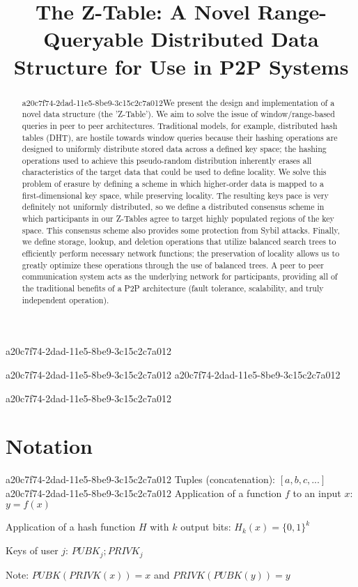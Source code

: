 \documentclass[12pt]{article}
\title{The Z-Table: A Novel Range-Queryable Distributed Data Structure for Use in P2P Systems}
\begin{document}
a20c7f74-2dad-11e5-8be9-3c15c2c7a012
\maketitle
a20c7f74-2dad-11e5-8be9-3c15c2c7a012
a20c7f74-2dad-11e5-8be9-3c15c2c7a012\begin{abstract}
a20c7f74-2dad-11e5-8be9-3c15c2c7a012We present the design and implementation of a novel data structure (the 'Z-Table'). We aim to solve the issue of window/range-based queries in peer to peer architectures. Traditional models, for example,  distributed hash tables (DHT), are hostile towards window queries because their hashing operations are designed to uniformly distribute stored data across a defined key space; the hashing operations used to achieve this pseudo-random distribution inherently erases all characteristics of the target data that could be used to define locality. We solve this problem of erasure by defining a scheme in which higher-order data is mapped to a first-dimensional key space, while preserving locality. The resulting keys pace is very definitely not uniformly distributed, so we define a distributed consensus scheme in which participants in our Z-Tables agree to target highly populated regions of the key space. This consensus scheme also provides some protection from Sybil attacks. Finally, we define storage, lookup, and deletion operations that utilize balanced search trees to efficiently perform necessary network functions; the preservation of locality allows us to greatly optimize these operations through the use of balanced trees. A peer to peer communication system acts as the underlying network for participants, providing all of the traditional benefits of a P2P architecture (fault tolerance, scalability, and truly independent operation).
\end{abstract}

a20c7f74-2dad-11e5-8be9-3c15c2c7a012\section{Notation}
a20c7f74-2dad-11e5-8be9-3c15c2c7a012
Tuples (concatenation): $[a,b,c,...]$
a20c7f74-2dad-11e5-8be9-3c15c2c7a012
Application of a function $f$ to an input $x$: $y=f(x)$

Application of a hash function $H$ with $k$ output bits: $H_{k}(x) = \{0,1\}^k$

Keys of user $j$: $ PUBK_j; PRIVK_j $

Note: $PUBK(PRIVK(x)) = x$ and $PRIVK(PUBK(y)) = y$~
\end{document}
